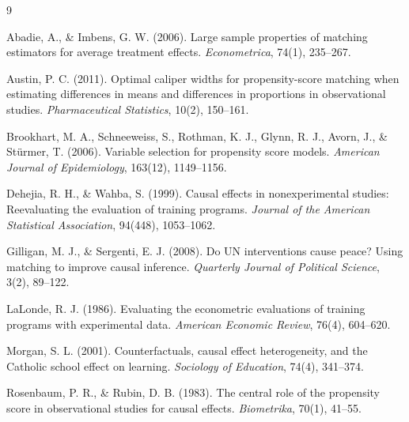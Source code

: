 \documentclass[11pt,a4paper]{article}
\begin{document}
\begin{thebibliography}{9}\small

Abadie, A., \& Imbens, G. W. (2006). Large sample properties of matching estimators for average treatment
effects. \emph{Econometrica}, 74(1), 235--267.

Austin, P. C. (2011). Optimal caliper widths for propensity-score matching when estimating differences in
means and differences in proportions in observational studies. \emph{Pharmaceutical Statistics}, 10(2), 150--161.

Brookhart, M. A., Schneeweiss, S., Rothman, K. J., Glynn, R. J., Avorn, J., \& Stürmer, T. (2006). Variable
selection for propensity score models. \emph{American Journal of Epidemiology}, 163(12), 1149--1156.

Dehejia, R. H., \& Wahba, S. (1999). Causal effects in nonexperimental studies: Reevaluating the
evaluation of training programs. \emph{Journal of the American Statistical Association}, 94(448), 1053--1062.

Gilligan, M. J., \& Sergenti, E. J. (2008). Do UN interventions cause peace? Using matching to improve
causal inference. \emph{Quarterly Journal of Political Science}, 3(2), 89--122.

LaLonde, R. J. (1986). Evaluating the econometric evaluations of training programs with experimental
data. \emph{American Economic Review}, 76(4), 604--620.

Morgan, S. L. (2001). Counterfactuals, causal effect heterogeneity, and the Catholic school effect on
learning. \emph{Sociology of Education}, 74(4), 341--374.

Rosenbaum, P. R., \& Rubin, D. B. (1983). The central role of the propensity score in observational
studies for causal effects. \emph{Biometrika}, 70(1), 41--55.

\end{thebibliography}
\end{document}
